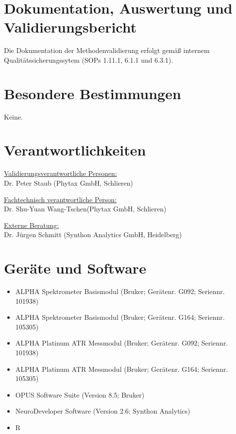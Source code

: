 \documentclass[11pt, a4paper]{article}
\begin{document}
\section{Dokumentation, Auswertung und Validierungsbericht}
Die Dokumentation der Methodenvalidierung erfolgt gemäß internem Qualitätssicherungssytem (SOPs 1.11.1, 6.1.1 und 6.3.1).


\section{Besondere Bestimmungen}
Keine.

\section{Verantwortlichkeiten}
\uline{Validierungsverantwortliche Personen:}\\
Dr. Peter Staub (Phytax GmbH, Schlieren)

\uline{Fachtechnisch verantwortliche Person:}\\
Dr. Shu-Yuan Wang-Tschen(Phytax GmbH, Schlieren)

\uline{Externe Beratung:}\\
Dr. Jürgen Schmitt (Synthon Analytics GmbH, Heidelberg)


\section{Geräte und Software}
\begin{itemize}
\item ALPHA Spektrometer Basismodul (Bruker; Gerätenr. G092; Seriennr. 101938)
\item ALPHA Spektrometer Basismodul (Bruker; Gerätenr. G164; Seriennr. 105305)
\item ALPHA Platinum ATR Messmodul (Bruker; Gerätenr. G092; Seriennr. 101938)
\item ALPHA Platinum ATR Messmodul (Bruker; Gerätenr. G164; Seriennr. 105305)
\item OPUS Software Suite (Version 8.5; Bruker)
\item NeuroDeveloper Software (Version 2.6; Synthon Analytics)
\item R
\end{itemize}
\end{document}
